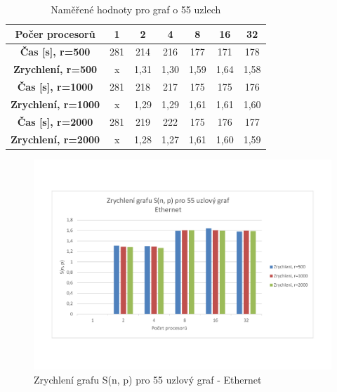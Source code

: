 \documentclass[11pt]{article}
\begin{document}
\begin{table}[h]
	\caption{Naměřené hodnoty pro graf o 55 uzlech}
	\label{tab:namereneHodnotyGraf55}
	\centering
	\begin{tabular}{| c || c | c | c | c | c | c |}
		\hline
		\textbf{Počer procesorů} & \textbf{1} & \textbf{2} & \textbf{4} & \textbf{8} & \textbf{16} & \textbf{32} \\
		\hline \hline
		\textbf{Čas [s], r=500} & 281 & 214 & 216 & 177 & 171 & 178 \\
		\hline
		\textbf{Zrychlení, r=500} & x & 1,31 & 1,30 & 1,59 & 1,64 & 1,58 \\
		\hline
		\textbf{Čas [s], r=1000} & 281 & 218 & 217 & 175 & 175 & 176 \\
		\hline
		\textbf{Zrychlení, r=1000} & x & 1,29 & 1,29 & 1,61 & 1,61 & 1,60 \\
		\hline
		\textbf{Čas [s], r=2000} & 281 & 219 & 222 & 175 & 176 & 177 \\
		\hline
		\textbf{Zrychlení, r=2000} & x & 1,28 & 1,27 & 1,61 & 1,60 & 1,59 \\
		\hline
	\end{tabular}
\end{table}

\begin{figure}[h]
  \centering
 	\caption{Zrychlení grafu S(n, p) pro 55 uzlový graf - Ethernet}
  	\includegraphics[width=15cm]{zrychleni55.pdf}
\end{figure}

\newpage
\end{document}
